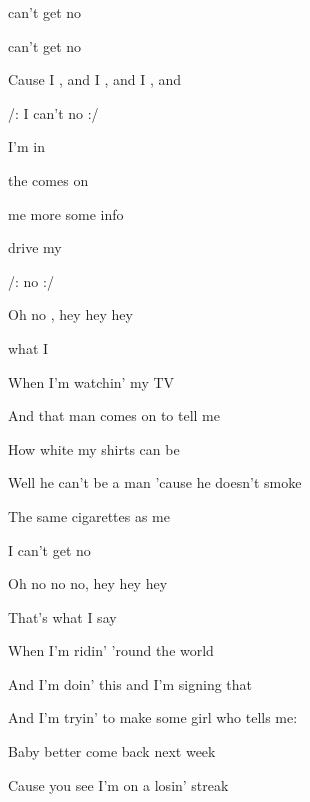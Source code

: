 


\zs
{} can't get no 

 can't get no 

Cause I , and I , and I , and 
\ks

\zr
/: {I} can't  no    :/
\kr

\zs
{} I'm  in  

 the  comes on  

  me more  
 some  info

  drive my 
\ks

\zr
/:   no   :/

Oh no  , hey hey hey  

 what I   
\kr

\zs
When I'm watchin' my TV

And that man comes on to tell me

How white my shirts can be

Well he can't be a man 'cause he doesn't smoke

The same cigarettes as me
\ks

\zr
I can't get no

Oh no no no, hey hey hey

That's what I say
\kr

\zs
When I'm ridin' 'round the world

And I'm doin' this and I'm signing that

And I'm tryin' to make some girl who tells me:

Baby better come back next week

Cause you see I'm on a losin' streak
\ks

\zr  \kr

\kp






















